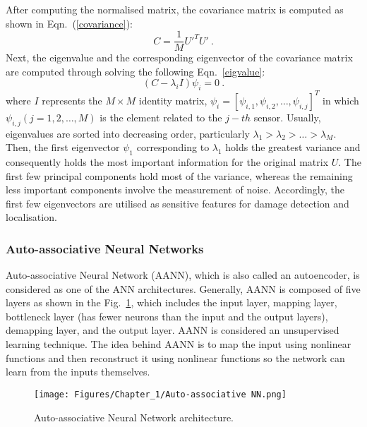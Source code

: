 After computing the normalised matrix, the covariance matrix is computed as shown in Eqn.~(\ref{covariance}):
\begin{equation}
	C = \frac{1}{M}U'^TU' \ .
	\label{covariance}
\end{equation}
Next, the eigenvalue and the corresponding eigenvector of the covariance matrix are computed through solving the following Eqn.~\ref{eigvalue}:
\begin{equation}
	(C-\lambda_iI)\psi_i =0 \ .
	\label{eigvalue}
\end{equation}
where \(I\) represents the \(M\times M\) identity matrix, \(\psi_i = [\psi_{i,1},\psi_{i,2}, \hdots, \psi_{i,j}]^T\) in which \(\psi_{i,j}(j=1, 2, \hdots, M)\) is the element related to the \(j-th\) sensor.
Usually, eigenvalues are sorted into decreasing order, particularly \(\lambda_1>\lambda_2>\hdots>\lambda_M\). 
Then, the first eigenvector \(\psi_1\) corresponding to \(\lambda_1\) holds the greatest variance and consequently holds the most important information for the original matrix $U$.
The first few principal components hold most of the variance, whereas the remaining less important components involve the measurement of noise.
Accordingly, the first few eigenvectors are utilised as sensitive features for damage detection and localisation.
\subsubsection{Auto-associative Neural Networks}
Auto-associative Neural Network (AANN), which is also called an autoencoder, is considered as one of the ANN architectures.
Generally, AANN is composed of five layers as shown in the Fig.~\ref{fig:AANN}, which includes the input layer, mapping layer, bottleneck layer (has fewer neurons than the input and the output layers), demapping layer, and the output layer.
AANN is considered an unsupervised learning technique.
The idea behind AANN is to map the input using nonlinear functions and then reconstruct it using nonlinear functions so the network can learn from the inputs themselves.
\begin{figure}[!ht]
	\begin{center}
		\centering
		\texttt{[image: Figures/Chapter\_1/Auto-associative NN.png]}
	\end{center}
	\caption{Auto-associative Neural Network architecture.} 
	\label{fig:AANN}
\end{figure}

